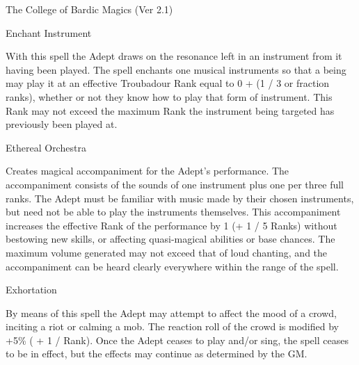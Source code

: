 \begin{Chapter}{The College of Bardic Magics (Ver 2.1)}
\begin{spell}[G-2]{Enchant Instrument}

\begin{effects}
With this spell the Adept draws on the resonance left in an instrument
from it having been played. The spell enchants one musical instruments
so that a being may play it at an effective Troubadour Rank equal to
0 + (1 / 3 or fraction ranks), whether or not they know how to play
that form of instrument.  This Rank may not exceed the maximum Rank
the instrument being targeted has previously been played at.
\end{effects}
\end{spell}

\begin{spell}[G-3]{Ethereal Orchestra}

\begin{effects}
Creates magical accompaniment for the Adept’s performance. The
accompaniment consists of the sounds of one instrument plus one per
three full ranks. The Adept must be familiar with music made by their
chosen instruments, but need not be able to play the instruments
themselves.  This accompaniment increases the effective Rank of the
performance by 1 (+ 1 / 5 Ranks) without bestowing new skills, or
affecting quasi-magical abilities or base chances.  The maximum volume
generated may not exceed that of loud chanting, and the accompaniment
can be heard clearly everywhere within the range of the spell.
\end{effects}
\end{spell}


\begin{spell}[G-4]{Exhortation}

\begin{effects}
By means of this spell the Adept may attempt to affect the mood of a
crowd, inciting a riot or calming a mob.  The reaction roll of the
crowd is modified by +5\% ( + 1 / Rank). Once the Adept ceases to play
and/or sing, the spell ceases to be in effect, but the effects may
continue as determined by the GM.
\end{effects}
\end{spell}


\end{Chapter}
